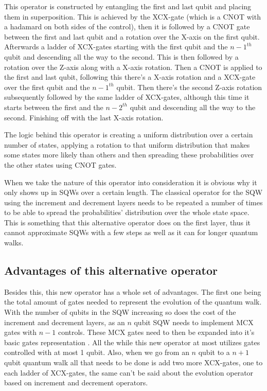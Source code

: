 This operator is constructed by entangling the first and last qubit and placing them in superposition. This is achieved by the XCX-gate (which is a CNOT with a hadamard on both sides of the control), then it is followed by a CNOT gate between the first and last qubit and a rotation over the X-axis on the first qubit. Afterwards a ladder of XCX-gates starting with the first qubit and the $n-1^{th}$ qubit and descending all the way to the second. This is then followed by a rotation over the Z-axis along with a X-axis rotation. Then a CNOT is applied to the first and last qubit, following this there's a X-axis rotation and a XCX-gate over the first qubit and the $n-1^{th}$ qubit. Then there's the second Z-axis rotation subsequently followed by the same ladder of XCX-gates, although this time it starts between the first and the $n-2^{th}$ qubit and descending all the way to the second. Finishing off with the last X-axis rotation.

The logic behind this operator is creating a uniform distribution over a certain number of states, applying a rotation to that uniform distribution that makes some states more likely than others and then spreading these probabilities over the other states using CNOT gates.

When we take the nature of this operator into consideration it is obvious why it only shows up in SQWs over a certain length. The classical operator for the SQW using the increment and decrement layers needs to be repeated a number of times to be able to spread the probabilities' distribution over the whole state space. This is something that this alternative operator does on the first layer, thus it cannot approximate SQWs with a few steps as well as it can for longer quantum walks.

\subsection{Advantages of this alternative operator}

Besides this, this new operator has a whole set of advantages. The first one being the total amount of gates needed to represent the evolution of the quantum walk. With the number of qubits in the SQW increasing so does the cost of the increment and decrement layers, as an $n$ qubit SQW needs to implement MCX gates with $n-1$ controls. These MCX gates need to then be expanded into it's basic gates representation \cite{gate-decomp}. All the while this new operator at most utilizes gates controlled with at most 1 qubit. Also, when we go from an $n$ qubit to a $n+1$ qubit quantum walk all that needs to be done is add two more XCX-gates, one to each ladder of XCX-gates, the same can't be said about the evolution operator based on increment and decrement operators. 

